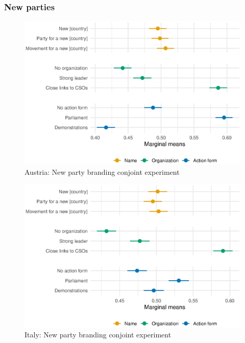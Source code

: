 \documentclass[12pt]{article}
\begin{document}
\subsubsection{New parties}

\begin{figure}[H]
\includegraphics[width=\textwidth]{./Figures/CJ1_main_tradeoff_Austria.eps}
\caption{Austria: New party branding conjoint experiment}
\end{figure}

\begin{figure}[H]
\includegraphics[width=\textwidth]{./Figures/CJ1_main_tradeoff_Italy.eps}
\caption{Italy: New party branding conjoint experiment}
\end{figure}
\end{document}
